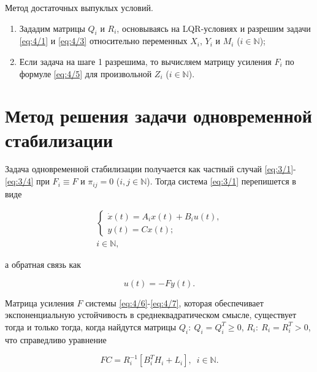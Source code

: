 \begin{alg}
\label{alg:4/1} Метод достаточных выпуклых условий.
\begin{enumerate}
\item Зададим матрицы $Q_i$ и $R_i$, основываясь на LQR-условиях и разрешим задачи \ref{eq:4/1} и \ref{eq:4/3} относительно переменных $X_i$, $Y_i$ и $M_i$ ($i \in \mathbb{N}$);
\item Если задача на шаге 1 разрешима, то вычисляем матрицу усиления $F_i$ по формуле \vref{eq:4/5} для произвольной $Z_i$ ($i \in \mathbb{N}$).
\end{enumerate}

\end{alg}






\section{Метод решения задачи одновременной стабилизации}

Задача одновременной стабилизации получается как частный случай \ref{eq:3/1}-\vref{eq:3/4} при $F_i \equiv F$ и $\pi_{ij}=0$ ($i,j \in \mathbb{N}$). Тогда система \vref{eq:3/1} перепишется в виде

\begin{eqnarray}
\label{eq:4/6}
\left\{ \begin{array}{l}
\dot{x}(t) = A_ix(t) + B_iu(t)\mbox{,} \\
y(t) = Cx(t)\mbox{;}
\end{array} \right. \\
i \in \mathbb{N}\mbox{,} \nonumber
\end{eqnarray}

а обратная связь как

\begin{equation}
\label{eq:4/7}
u(t) = -Fy(t)\mbox{.}
\end{equation}

Матрица усиления $F$ системы \ref{eq:4/6}-\vref{eq:4/7}, которая обеспечивает экспоненциальную устойчивость в среднеквадратическом смысле, существует тогда и только тогда, когда найдутся матрицы $Q_i\colon~Q_i = Q_i^T \geqslant 0$, $R_i\colon~R_i = R_i^T > 0$, что справедливо уравнение

\begin{equation}
\label{eq:4/8}
FC = R_i^{-1}[B_i^TH_i + L_i]\mbox{,}~~~i \in \mathbb{N}\mbox{.}
\end{equation}

